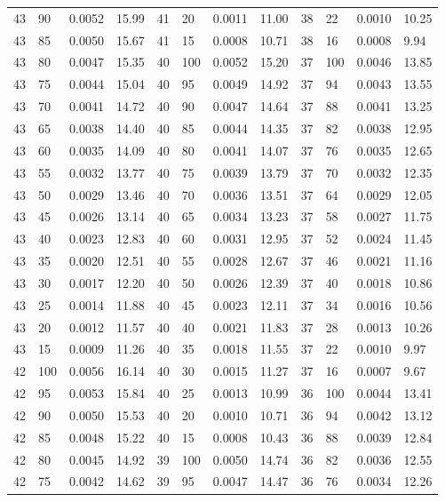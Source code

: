 \begin{tabular}{llll|llll|llll}
43 & 90 & 0.0052 & 15.99 & 41 & 20 & 0.0011 & 11.00 & 38 & 22 & 0.0010 & 10.25\\
43 & 85 & 0.0050 & 15.67 & 41 & 15 & 0.0008 & 10.71 & 38 & 16 & 0.0008 & 9.94\\
43 & 80 & 0.0047 & 15.35 & 40 & 100 & 0.0052 & 15.20 & 37 & 100 & 0.0046 & 13.85\\
43 & 75 & 0.0044 & 15.04 & 40 & 95 & 0.0049 & 14.92 & 37 & 94 & 0.0043 & 13.55\\
43 & 70 & 0.0041 & 14.72 & 40 & 90 & 0.0047 & 14.64 & 37 & 88 & 0.0041 & 13.25\\
43 & 65 & 0.0038 & 14.40 & 40 & 85 & 0.0044 & 14.35 & 37 & 82 & 0.0038 & 12.95\\
43 & 60 & 0.0035 & 14.09 & 40 & 80 & 0.0041 & 14.07 & 37 & 76 & 0.0035 & 12.65\\
43 & 55 & 0.0032 & 13.77 & 40 & 75 & 0.0039 & 13.79 & 37 & 70 & 0.0032 & 12.35\\
43 & 50 & 0.0029 & 13.46 & 40 & 70 & 0.0036 & 13.51 & 37 & 64 & 0.0029 & 12.05\\
43 & 45 & 0.0026 & 13.14 & 40 & 65 & 0.0034 & 13.23 & 37 & 58 & 0.0027 & 11.75\\
43 & 40 & 0.0023 & 12.83 & 40 & 60 & 0.0031 & 12.95 & 37 & 52 & 0.0024 & 11.45\\
43 & 35 & 0.0020 & 12.51 & 40 & 55 & 0.0028 & 12.67 & 37 & 46 & 0.0021 & 11.16\\
43 & 30 & 0.0017 & 12.20 & 40 & 50 & 0.0026 & 12.39 & 37 & 40 & 0.0018 & 10.86\\
43 & 25 & 0.0014 & 11.88 & 40 & 45 & 0.0023 & 12.11 & 37 & 34 & 0.0016 & 10.56\\
43 & 20 & 0.0012 & 11.57 & 40 & 40 & 0.0021 & 11.83 & 37 & 28 & 0.0013 & 10.26\\
43 & 15 & 0.0009 & 11.26 & 40 & 35 & 0.0018 & 11.55 & 37 & 22 & 0.0010 & 9.97\\
42 & 100 & 0.0056 & 16.14 & 40 & 30 & 0.0015 & 11.27 & 37 & 16 & 0.0007 & 9.67\\
42 & 95 & 0.0053 & 15.84 & 40 & 25 & 0.0013 & 10.99 & 36 & 100 & 0.0044 & 13.41\\
42 & 90 & 0.0050 & 15.53 & 40 & 20 & 0.0010 & 10.71 & 36 & 94 & 0.0042 & 13.12\\
42 & 85 & 0.0048 & 15.22 & 40 & 15 & 0.0008 & 10.43 & 36 & 88 & 0.0039 & 12.84\\
42 & 80 & 0.0045 & 14.92 & 39 & 100 & 0.0050 & 14.74 & 36 & 82 & 0.0036 & 12.55\\
42 & 75 & 0.0042 & 14.62 & 39 & 95 & 0.0047 & 14.47 & 36 & 76 & 0.0034 & 12.26\\

\end{tabular}
